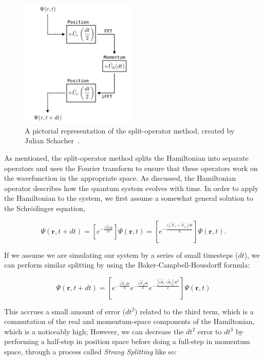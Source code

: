 \begin{figure}

\center \includegraphics[width=0.5\textwidth]{data/splitop/method/split_op_method.pdf}

\label{fig:method}
\caption{A pictorial representation of the split-operator method, created by Julian Schacher~\cite{AAA}.}
\end{figure}

As mentioned, the split-operator method splits the Hamiltonian into separate operators and uses the Fourier transform to ensure that these operators work on the wavefunction in the appropriate space.
As discussed, the Hamiltonian operator describes how the quantum system evolves with time.
In order to apply the Hamiltonian to the system, we first assume a somewhat general solution to the Schr\"odinger equation,

$$
\Psi(\mathbf{r},t + dt) = \left[e^{-\frac{i\mathcal{\hat{H}}dt}{\hbar}}\right]\Psi(\mathbf{r},t) = \left[e^{-\frac{i(\mathcal{\hat{H}}_v + \mathcal{\hat{H}}_p)dt}{\hbar}}\right]\Psi(\mathbf{r},t).
$$

\noindent If we assume we are simulating our system by a series of small timesteps ($dt$), we can perform similar splitting by using the Baker-Campbell-Housdorff formula:

$$
\Psi(\mathbf{r},t+dt) = \left[e^{-\frac{i\mathcal{\hat{H}}_vdt}{\hbar}}e^{-\frac{i\mathcal{\hat{H}}_pdt}{\hbar}}e^{-\frac{[i\hat{H}_r, i\hat{H}_k]dt^2}{2}}\right]\Psi(\mathbf{r},t)
$$

\noindent This accrues a small amount of error ($dt^2$) related to the third term, which is a commutation of the real and momentum-space components of the Hamiltonian, which is a noticeably high;
However, we can decrease the $dt^2$ error to $dt^3$ by performing a half-step in position space before doing a full-step in momentum space, through a process called \textit{Strang Splitting} like so:

